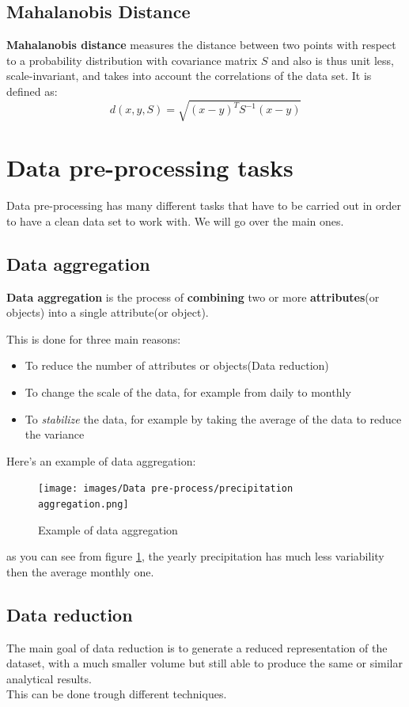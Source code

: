 \subsection{Mahalanobis Distance}
\textbf{Mahalanobis distance} measures the distance between two points
with respect to a probability distribution with covariance matrix $S$
and also  is thus unit less, scale-invariant, and takes into account
the correlations of the data set. It is defined as:
\begin{equation}
  d(x,y,S) = \sqrt{(x-y)^T S^{-1} (x-y)}
\end{equation}

\section{Data pre-processing tasks}
Data pre-processing has many different tasks that have to be carried
out in order to have a clean data set to work with. We will go over
the main ones.
\subsection{Data aggregation}
\begin{boxH}
  \textbf{Data aggregation }is the process of \textbf{combining} two
  or more \textbf{attributes}(or objects) into a single attribute(or
  object).
\end{boxH}
This is done for three main reasons:
\begin{itemize}
  \item To reduce the number of attributes or objects(Data reduction)
  \item To change the scale of the data, for example from daily to
    monthly
  \item To \textit{stabilize} the data, for example by taking the
    average of the data to reduce the variance
\end{itemize}
Here's an example of data aggregation:
\begin{figure}[H]
  \centering
  \texttt{[image: images/Data
  pre-process/precipitation aggregation.png]}
  \caption{Example of data aggregation}
  \label{fig:data-aggregation}
\end{figure}
as you can see from figure \ref{fig:data-aggregation}, the yearly
precipitation has much less variability then the average monthly
one.
\subsection{Data reduction}
The main goal of data reduction is to generate a reduced
representation of the dataset, with a much smaller volume but 
still able to produce the same or similar analytical results.\\
This can be done trough different techniques.
